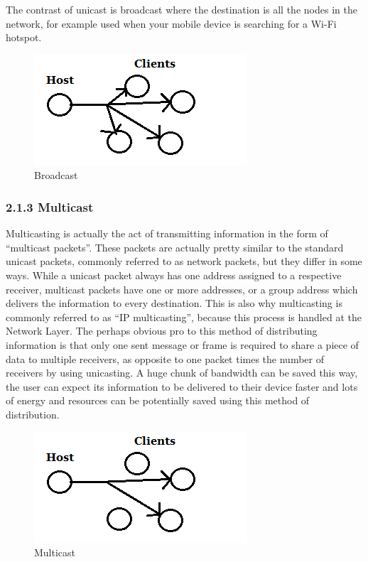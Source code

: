 \documentclass[9pt,a4paper]{acmproc}
\begin{document}
The contrast of unicast is broadcast where the destination is all the nodes in the network, for example used when your mobile device is searching for a Wi-Fi hotspot.
\begin{figure}[h!]
\includegraphics[width=\linewidth]{broadcast.png}
\caption{Broadcast}
\label{fig:Broadcast}
\end{figure}

\subsubsection*{2.1.3 Multicast}

Multicasting is actually the act of transmitting information in the form of “multicast packets”. These packets are actually pretty similar to the standard unicast packets, commonly referred to as network packets, but they differ in some ways. While a unicast packet always has one address assigned to a respective receiver, multicast packets have one or more addresses, or a group address which delivers the information to every destination. This is also why multicasting is commonly referred to as “IP multicasting”, because this process is handled at the Network Layer. The perhaps obvious pro to this method of distributing information is that only one sent message or frame is required to share a piece of data to multiple receivers, as opposite to one packet times the number of receivers by using unicasting. A huge chunk of bandwidth can be saved this way, the user can expect its information to be delivered to their device faster and lots of energy and resources can be potentially saved using this method of distribution.
	
	\begin{figure}[h!]
\includegraphics[width=\linewidth]{multicast.png}
\caption{Multicast}
\label{fig:Multicast}
\end{figure}
\end{document}
